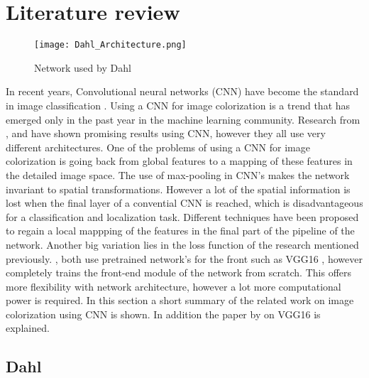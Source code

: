 \section{Literature review} \label{sec:litreview}

\begin{wrapfigure}{R}{0.4\textwidth}
	\vspace{-20pt}
	\begin{center}
		\texttt{[image: Dahl\_Architecture.png]}
	\end{center}
	\caption{Network used by Dahl \cite{Dahl}}
	\label{fig:dahlnetwork}
	\vspace{-20pt}
\end{wrapfigure}

In recent years, Convolutional neural networks (CNN) have become the standard in image
classification \cite{Krizhevsky}. Using a CNN for image colorization is a trend that has emerged only in the past year in the machine learning community. Research from \cite{Dahl}, \cite{Zhang}
and \cite{Cheng} have shown promising results using CNN, however they all use very different
architectures. One of the problems of using a CNN for image colorization is going back from global features to a mapping of these features in the detailed image space. The use of max-pooling in CNN's makes the network invariant to spatial transformations. However a lot of the spatial information is lost when the final layer of a convential CNN is reached, which is disadvantageous for a classification and localization task. Different techniques have been proposed to regain a local mappping of the features in the final part of the pipeline of the network. Another big variation lies in the loss function of the research mentioned previously. \cite{Dahl}, \cite{Zhang} both use pretrained network's for the front such as VGG16 \cite{Simonyan}, however \cite{Cheng} completely trains the front-end module of the network from scratch. This offers more flexibility with network architecture, however a lot more computational power is required. In
this section a short summary of the related work on image colorization using CNN is shown. In addition the paper by \cite{Simonyan} on VGG16 is explained.

\subsection{Dahl}

